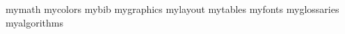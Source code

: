 \usepackage{standalone}

\usepackage{listings} %
\usepackage{csquotes}
\usepackage{comment}

{mymath}
{mycolors}
{mybib}
{mygraphics}
{mylayout}
{mytables}
{myfonts}
{myglossaries}
{myalgorithms}

\usepackage[colorlinks=true, allcolors = unipdred, linktocpage = true]{hyperref}
\usepackage{cleveref}


\usepackage{subfiles}

\newcommand{\etal}{\textit{et al}., }
\newcommand{\ie}{\textit{i}.\textit{e}., }
\newcommand{\eg}{\textit{e}.\textit{g}.\ }


\newenvironment{dedication}
  {\clearpage           %
   \thispagestyle{empty}%
   \vspace*{\stretch{1}}%
   \itshape             %
   \raggedleft          %
  }
  {\par %
   \vspace{\stretch{3}} %
   \clearpage           %
  }